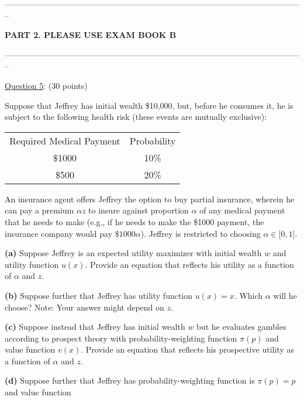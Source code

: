 \documentclass[12pt]{article}
\theoremstyle{definition}
\begin{document}
\bigskip


\pagebreak

\begin{center}
	--------------------------------------------------------------------------------------------------------------
	
	\textbf{PART 2. PLEASE USE EXAM BOOK B} 
	
	--------------------------------------------------------------------------------------------------------------
\end{center}
\vspace*{.25in}

\underline{Question 5}: (30 points)

Suppose that Jeffrey has initial wealth \$10,000, but, before he consumes
it, he is subject to the following health risk (these events are mutually
exclusive):

\begin{center}
\begin{tabular}[t]{cc}
Required Medical Payment & Probability \\ 
\$1000 & 10\% \\ 
\$500 & 20\%%
\end{tabular}
\end{center}

An insurance agent offers Jeffrey the option to buy partial insurance,
wherein he can pay a premium $\alpha z$ to insure against proportion $\alpha 
$ of any medical payment that he needs to make (e.g., if he needs to make
the \$1000 payment, the insurance company would pay $\$1000\alpha $).
Jeffrey is restricted to choosing $\alpha \in \lbrack 0,1]$.

\textbf{(a)} Suppose Jeffrey is an expected utility maximizer with initial
wealth $w$ and utility function $u(x)$. Provide an equation that reflects
his utility as a function of $\alpha $ and $z$.

\textbf{(b)} Suppose further that Jeffrey has utility function $u(x)=x$.
Which $\alpha $ will he choose? Note: Your answer might
depend on $z$.

\textbf{(c)} Suppose instead that Jeffrey has initial wealth $w$ but he
evaluates gambles according to prospect theory with probability-weighting
function $\pi (p)$ and value function $v(x)$. Provide an equation that
reflects his prospective utility as a function of $\alpha $ and $z$.

\textbf{(d)} Suppose further that Jeffrey has probability-weighting function
is $\pi (p)=p$ and value function
\end{document}
